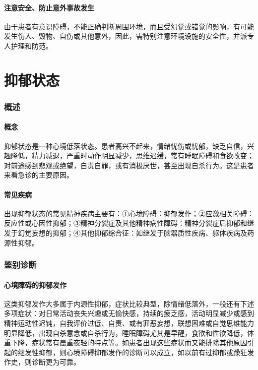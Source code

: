 \paragraph{注意安全、防止意外事故发生}

由于患者有意识障碍，不能正确判断周围环境，而且受幻觉或错觉的影响，有可能发生伤人、毁物、自伤或其他意外，因此，需特别注意环境设施的安全性，并派专人护理和防范。

\protect\hypertarget{text00045.html}{}{}

\section{抑郁状态}

\subsubsection{概述}

\paragraph{概念}

抑郁状态是一种心境低落状态。患者高兴不起来，情绪忧伤或忧郁，缺乏自信，兴趣降低，精力减退，严重时动作明显减少，思维迟缓，常有睡眠障碍和食欲改变；对前途感到悲观或绝望，自责自罪，或有消极厌世，甚至出现自杀行为。这是患者来看急诊的主要原因。

\paragraph{常见疾病}

出现抑郁状态的常见精神疾病主要有：①心境障碍：抑郁发作；②应激相关障碍：反应性或心因性抑郁；③精神分裂症及其他精神病性障碍：精神分裂症后抑郁和继发于幻觉妄想的抑郁；④其他抑郁综合征：如继发于脑器质性疾病、躯体疾病及药源性抑郁。

\subsubsection{鉴别诊断}

\paragraph{心境障碍的抑郁发作}

这类抑郁发作大多属于内源性抑郁，症状比较典型，除情绪低落外，一般还有下述多项症状：对日常活动丧失兴趣或无愉快感，持续的疲乏感，活动明显减少或感到精神运动性迟钝，自我评价过低、自责、或有罪恶妄想，联想困难或自觉思维能力明显降低，出现自杀意念或自杀行为，睡眠障碍尤其是早醒，食欲和性欲降低，体重下降，症状常有晨重夜轻的特点等。如患者出现这些症状而又能排除其他原因引起的继发性抑郁，则心境障碍抑郁发作的诊断可以成立，如以前有过抑郁或躁狂发作史，则诊断更为可靠。

